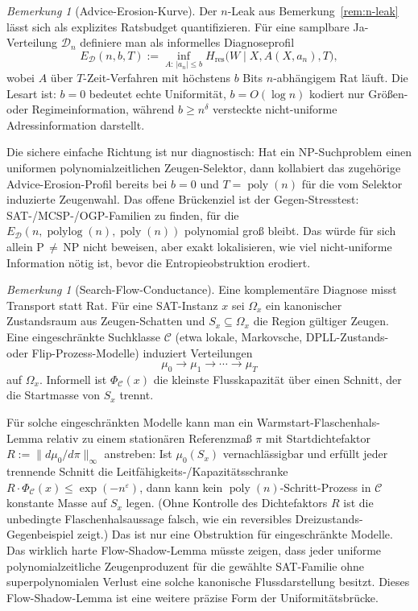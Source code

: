 \documentclass[aps,prd,twocolumn,superscriptaddress,nofootinbib]{revtex4-2}
\theoremstyle{definition}
\theoremstyle{remark}
\newtheorem{remark}[theorem]{Bemerkung}
\DeclareMathOperator{\poly}{poly}
\begin{document}
\begin{remark}[Advice-Erosion-Kurve]\label{rem:advice-erosion}
Der $n$-Leak aus Bemerkung~\ref{rem:n-leak} lässt sich als explizites
Ratsbudget quantifizieren.  Für eine samplbare Ja-Verteilung
$\mathcal{D}_n$ definiere man als informelles Diagnoseprofil
\[
E_{\mathcal{D}}(n,b,T)
  := \inf_{A:\,|a_n|\leq b}
     H_{\mathrm{res}}\bigl(W \mid X,A(X,a_n),T\bigr),
\]
wobei $A$ über $T$-Zeit-Verfahren mit höchstens $b$ Bits
$n$-abhängigem Rat läuft.  Die Lesart ist: $b=0$ bedeutet echte
Uniformität, $b=O(\log n)$ kodiert nur Größen- oder Regimeinformation,
während $b\geq n^\delta$ versteckte nicht-uniforme Adressinformation
darstellt.

Die sichere einfache Richtung ist nur diagnostisch: Hat ein NP-Suchproblem
einen uniformen polynomialzeitlichen Zeugen-Selektor, dann kollabiert das
zugehörige Advice-Erosion-Profil bereits bei $b=0$ und $T=\poly(n)$ für
die vom Selektor induzierte Zeugenwahl.  Das offene Brückenziel ist der
Gegen-Stresstest: SAT-/MCSP-/OGP-Familien zu finden, für die
$E_{\mathcal{D}}(n,\operatorname{polylog}(n),\poly(n))$ polynomial groß bleibt.  Das würde
für sich allein P$\,\neq\,$NP nicht beweisen, aber exakt lokalisieren, wie
viel nicht-uniforme Information nötig ist, bevor die Entropieobstruktion
erodiert.
\end{remark}

\begin{remark}[Search-Flow-Conductance]\label{rem:search-flow-conductance}
Eine komplementäre Diagnose misst Transport statt Rat.  Für eine
SAT-Instanz $x$ sei $\Omega_x$ ein kanonischer Zustandsraum aus
Zeugen-Schatten und $S_x\subseteq\Omega_x$ die Region gültiger Zeugen.
Eine eingeschränkte Suchklasse $\mathcal{C}$ (etwa lokale, Markovsche,
DPLL-Zustands- oder Flip-Prozess-Modelle) induziert Verteilungen
\[
\mu_0 \to \mu_1 \to \cdots \to \mu_T
\]
auf $\Omega_x$.  Informell ist $\Phi_{\mathcal{C}}(x)$ die kleinste
Flusskapazität über einen Schnitt, der die Startmasse von $S_x$ trennt.

Für solche eingeschränkten Modelle kann man ein Warmstart-Flaschenhals-Lemma relativ zu einem stationären Referenzmaß $\pi$ mit Startdichtefaktor $R := \|d\mu_0/d\pi\|_\infty$ anstreben: Ist $\mu_0(S_x)$ vernachlässigbar und erfüllt jeder trennende Schnitt die Leitfähigkeits-/Kapazitätsschranke
$R \cdot \Phi_{\mathcal{C}}(x)\leq \exp(-n^\varepsilon)$, dann kann kein
$\poly(n)$-Schritt-Prozess in $\mathcal{C}$ konstante Masse auf $S_x$
legen. (Ohne Kontrolle des Dichtefaktors $R$ ist die unbedingte Flaschenhalsaussage falsch, wie ein reversibles Dreizustands-Gegenbeispiel zeigt.)  Das ist nur eine Obstruktion für eingeschränkte Modelle.  Das
wirklich harte \glqq Flow-Shadow\grqq{}-Lemma müsste zeigen, dass jeder uniforme
polynomialzeitliche Zeugenproduzent für die gewählte SAT-Familie ohne
superpolynomialen Verlust eine solche kanonische Flussdarstellung besitzt.
Dieses Flow-Shadow-Lemma ist eine weitere präzise Form der
Uniformitätsbrücke.
\end{remark}
\end{document}
